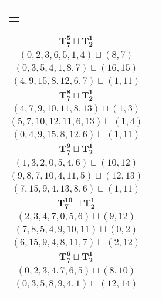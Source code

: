 \documentclass{article}
\begin{document}
\begin{longtable}{|c|c|}
\begin{tabular}{c}
        $(7,15,9,4,0,8,6)\sqcup(1,11)$
        \end{tabular} \\ 
        \hline
        $\mathbf{T_{7}^{5}} \sqcup \mathbf{T_{2}^{1}}$ & \begin{tabular}{c}
        $(2,4,6,9,12,8,7)\sqcup(11,14)$ \\ 
        $(0,2,3,6,5,1,4)\sqcup(8,7)$ \\ 
        $(0,3,5,4,1,8,7)\sqcup(16,15)$ \\ 
        $(4,9,15,8,12,6,7)\sqcup(1,11)$
        \end{tabular} \\ 
        \hline
        $\mathbf{T_{7}^{8}} \sqcup \mathbf{T_{2}^{1}}$ & \begin{tabular}{c}
        $(1,2,4,6,8,5,9)\sqcup(12,15)$ \\ 
        $(4,7,9,10,11,8,13)\sqcup(1,3)$ \\ 
        $(5,7,10,12,11,6,13)\sqcup(1,4)$ \\ 
        $(0,4,9,15,8,12,6)\sqcup(1,11)$
        \end{tabular} \\ 
        \hline
        $\mathbf{T_{7}^{9}} \sqcup \mathbf{T_{2}^{1}}$ & \begin{tabular}{c}
        $(8,6,4,2,5,9,7)\sqcup(12,14)$ \\ 
        $(1,3,2,0,5,4,6)\sqcup(10,12)$ \\ 
        $(9,8,7,10,4,11,5)\sqcup(12,13)$ \\ 
        $(7,15,9,4,13,8,6)\sqcup(1,11)$
        \end{tabular} \\ 
        \hline
        $\mathbf{T_{7}^{10}} \sqcup \mathbf{T_{2}^{1}}$ & \begin{tabular}{c}
        $(7,6,4,2,8,9,5)\sqcup(12,14)$ \\ 
        $(2,3,4,7,0,5,6)\sqcup(9,12)$ \\ 
        $(7,8,5,4,9,10,11)\sqcup(0,2)$ \\ 
        $(6,15,9,4,8,11,7)\sqcup(2,12)$
        \end{tabular} \\ 
        \hline
        $\mathbf{T_{7}^{6}} \sqcup \mathbf{T_{2}^{1}}$ & \begin{tabular}{c}
        $(2,4,6,8,7,9,12)\sqcup(13,14)$ \\ 
        $(0,2,3,4,7,6,5)\sqcup(8,10)$ \\ 
        $(0,3,5,8,9,4,1)\sqcup(12,14)$ \\ 

\end{tabular}
\end{longtable}
\end{document}
